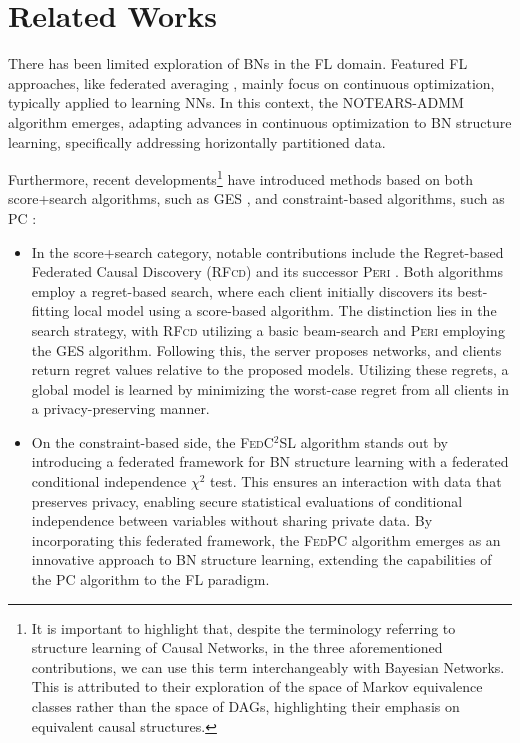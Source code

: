 \section{Related Works}
\label{subsec:relatedWorks}

There has been limited exploration of BNs in the FL domain. Featured FL approaches, like federated averaging \cite{mcmahan17aFL}, mainly focus on continuous optimization, typically applied to learning NNs. In this context, the NOTEARS-ADMM \cite{ng22aNOTEARS} algorithm emerges, adapting advances in continuous optimization to BN structure learning, specifically addressing horizontally partitioned data.

Furthermore, recent developments\footnote{It is important to highlight that, despite the terminology referring to structure learning of Causal Networks, in the three aforementioned contributions, we can use this term interchangeably with Bayesian Networks. This is attributed to their exploration of the space of Markov equivalence classes rather than the space of DAGs, highlighting their emphasis on equivalent causal structures.} have introduced methods based on both score+search algorithms, such as GES \cite{chickering2002GES}, and constraint-based algorithms, such as PC \cite{Spirtes2001PC}:
\begin{itemize}
    \item In the score+search category, notable contributions include the Regret-based Federated Causal Discovery (\textsc{RFcd}) \cite{mian22aRFCD} and its successor \textsc{Peri} \cite{mian23aPERI}. Both algorithms employ a regret-based search, where each client initially discovers its best-fitting local model using a score-based algorithm. The distinction lies in the search strategy, with \textsc{RFcd} utilizing a basic beam-search and \textsc{Peri} employing the GES algorithm. Following this, the server proposes networks, and clients return regret values relative to the proposed models. Utilizing these regrets, a global model is learned by minimizing the worst-case regret from all clients in a privacy-preserving manner.

    \item On the constraint-based side, the \textsc{FedC$^2$SL} algorithm \cite{Wang2023FedC2SL} stands out by introducing a federated framework for BN structure learning with a federated conditional independence $\chi^2$ test. This ensures an interaction with data that preserves privacy, enabling secure statistical evaluations of conditional independence between variables without sharing private data. By incorporating this federated framework, the \textsc{FedPC} algorithm emerges as an innovative approach to BN structure learning, extending the capabilities of the PC algorithm to the FL paradigm.
\end{itemize}

%
%

